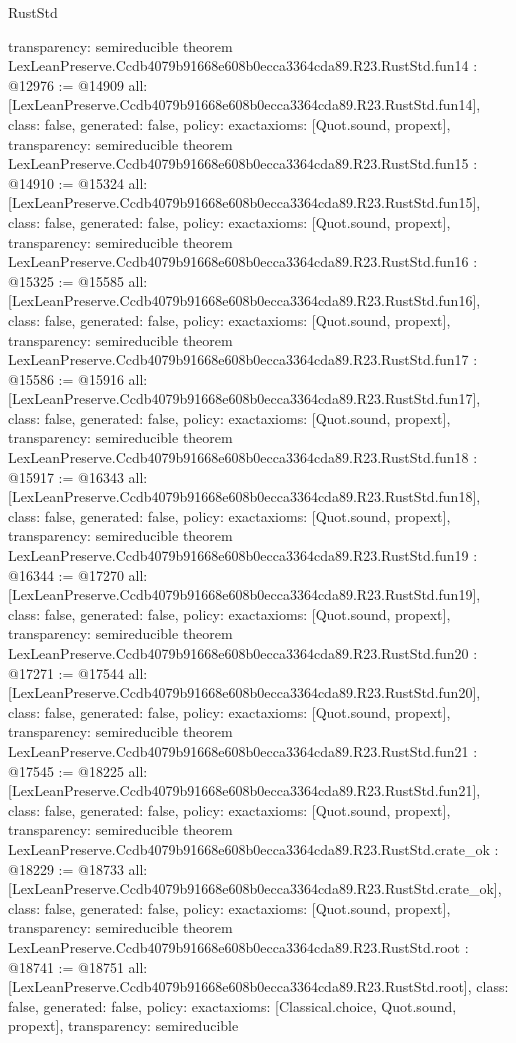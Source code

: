 \begin{lexlean}{RustStd}
\begin{coremodule}
{  transparency: semireducible
}
theorem LexLeanPreserve.Ccdb4079b91668e608b0ecca3364cda89.R23.RustStd.fun14 : @12976 := @14909 {
  all: [LexLeanPreserve.Ccdb4079b91668e608b0ecca3364cda89.R23.RustStd.fun14],
  class: false,
  generated: false,
  policy: exact{axioms: [Quot.sound, propext]},
  transparency: semireducible
}
theorem LexLeanPreserve.Ccdb4079b91668e608b0ecca3364cda89.R23.RustStd.fun15 : @14910 := @15324 {
  all: [LexLeanPreserve.Ccdb4079b91668e608b0ecca3364cda89.R23.RustStd.fun15],
  class: false,
  generated: false,
  policy: exact{axioms: [Quot.sound, propext]},
  transparency: semireducible
}
theorem LexLeanPreserve.Ccdb4079b91668e608b0ecca3364cda89.R23.RustStd.fun16 : @15325 := @15585 {
  all: [LexLeanPreserve.Ccdb4079b91668e608b0ecca3364cda89.R23.RustStd.fun16],
  class: false,
  generated: false,
  policy: exact{axioms: [Quot.sound, propext]},
  transparency: semireducible
}
theorem LexLeanPreserve.Ccdb4079b91668e608b0ecca3364cda89.R23.RustStd.fun17 : @15586 := @15916 {
  all: [LexLeanPreserve.Ccdb4079b91668e608b0ecca3364cda89.R23.RustStd.fun17],
  class: false,
  generated: false,
  policy: exact{axioms: [Quot.sound, propext]},
  transparency: semireducible
}
theorem LexLeanPreserve.Ccdb4079b91668e608b0ecca3364cda89.R23.RustStd.fun18 : @15917 := @16343 {
  all: [LexLeanPreserve.Ccdb4079b91668e608b0ecca3364cda89.R23.RustStd.fun18],
  class: false,
  generated: false,
  policy: exact{axioms: [Quot.sound, propext]},
  transparency: semireducible
}
theorem LexLeanPreserve.Ccdb4079b91668e608b0ecca3364cda89.R23.RustStd.fun19 : @16344 := @17270 {
  all: [LexLeanPreserve.Ccdb4079b91668e608b0ecca3364cda89.R23.RustStd.fun19],
  class: false,
  generated: false,
  policy: exact{axioms: [Quot.sound, propext]},
  transparency: semireducible
}
theorem LexLeanPreserve.Ccdb4079b91668e608b0ecca3364cda89.R23.RustStd.fun20 : @17271 := @17544 {
  all: [LexLeanPreserve.Ccdb4079b91668e608b0ecca3364cda89.R23.RustStd.fun20],
  class: false,
  generated: false,
  policy: exact{axioms: [Quot.sound, propext]},
  transparency: semireducible
}
theorem LexLeanPreserve.Ccdb4079b91668e608b0ecca3364cda89.R23.RustStd.fun21 : @17545 := @18225 {
  all: [LexLeanPreserve.Ccdb4079b91668e608b0ecca3364cda89.R23.RustStd.fun21],
  class: false,
  generated: false,
  policy: exact{axioms: [Quot.sound, propext]},
  transparency: semireducible
}
theorem LexLeanPreserve.Ccdb4079b91668e608b0ecca3364cda89.R23.RustStd.crate_ok : @18229 := @18733 {
  all: [LexLeanPreserve.Ccdb4079b91668e608b0ecca3364cda89.R23.RustStd.crate_ok],
  class: false,
  generated: false,
  policy: exact{axioms: [Quot.sound, propext]},
  transparency: semireducible
}
theorem LexLeanPreserve.Ccdb4079b91668e608b0ecca3364cda89.R23.RustStd.root : @18741 := @18751 {
  all: [LexLeanPreserve.Ccdb4079b91668e608b0ecca3364cda89.R23.RustStd.root],
  class: false,
  generated: false,
  policy: exact{axioms: [Classical.choice, Quot.sound, propext]},
  transparency: semireducible
}


\end{coremodule}
\end{lexlean}
